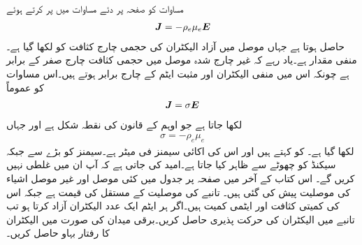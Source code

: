مساوات  کو صفحہ  پر دئے مساوات  میں پر کرتے ہوئے
\begin{align}
{\ensuremath{{\boldsymbol{J}}}}=-\rho_e \mu_e {{\boldsymbol{E}}}
\end{align}
حاصل ہوتا ہے جہاں موصل میں آزاد الیکٹران کی حجمی چارج کثافت کو  لکھا گیا ہے۔ منفی مقدار ہے۔یاد رہے کہ غیر چارج شدہ موصل میں حجمی کثافت چارج صفر کے برابر ہے چونکہ اس میں منفی الیکٹران  اور مثبت ایٹم کے چارج برابر ہوتے ہیں۔اس مساوات کو عموماً
\begin{align}\label{مساوات_کپیسٹر-اوہم_قانون_نقطہ_شکل}
{\ensuremath{{\boldsymbol{J}}}}=\sigma {\ensuremath{{\boldsymbol{E}}}}
\end{align}
لکھا جاتا ہے جو اوہم کے قانون کی نقطہ شکل ہے اور جہاں
\begin{align}\label{مساوات_کپیسٹر_موصلیت_تعریف}
\sigma=-\rho_e \mu_e
\end{align}
لکھا گیا ہے۔ کو  کہتے ہیں اور اس کی اکائی سیمنز فی میٹر  ہے۔سیمنز کو بڑے  سے  جبکہ سیکنڈ کو چھوٹے  سے ظاہر کیا جاتا ہے۔امید کی جاتی ہے کہ آپ ان میں غلطی نہیں کریں گے۔ اس کتاب کے آخر میں صفحہ   پر جدول  میں کئی موصل اور غیر موصل اشیاء کی موصلیت پیش کی گئی ہیں۔
تانبے کی موصلیت کے مستقل  کی قیمت  ہے جبکہ اس کی کمیتی کثافت  اور ایٹمی کمیت  ہیں۔اگر ہر ایٹم ایک عدد الیکٹران آزاد کرتا ہو تب تانبے میں الیکٹران کی حرکت پذیری حاصل کریں۔برقی میدان  کی صورت میں الیکٹران کا رفتار بہاو حاصل کریں۔

